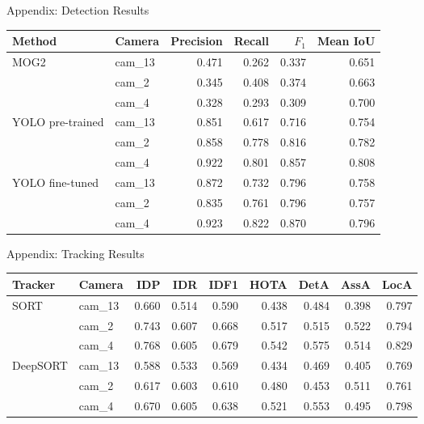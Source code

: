 \begin{frame}{Appendix: Detection Results}
\footnotesize
\centering
\begin{tabular}{llrrrr}
\toprule
Method & Camera & Precision & Recall & $F_1$ & Mean IoU \\
\midrule
\multirow{3}{*}{MOG2}
  & cam\_13 & 0.471 & 0.262 & 0.337 & 0.651 \\
  & cam\_2  & 0.345 & 0.408 & 0.374 & 0.663 \\
  & cam\_4  & 0.328 & 0.293 & 0.309 & 0.700 \\
\midrule
\multirow{3}{*}{YOLO pre-trained}
  & cam\_13 & 0.851 & 0.617 & 0.716 & 0.754 \\
  & cam\_2  & 0.858 & 0.778 & 0.816 & 0.782 \\
  & cam\_4  & 0.922 & 0.801 & 0.857 & 0.808 \\
\midrule
\multirow{3}{*}{YOLO fine-tuned}
  & cam\_13 & 0.872 & 0.732 & 0.796 & 0.758 \\
  & cam\_2  & 0.835 & 0.761 & 0.796 & 0.757 \\
  & cam\_4  & 0.923 & 0.822 & 0.870 & 0.796 \\
\bottomrule
\end{tabular}
\end{frame}

\begin{frame}{Appendix: Tracking Results}
\footnotesize
\centering
\setlength{\tabcolsep}{4.5pt}
\begin{tabular}{llrrrrrrr}
\toprule
Tracker & Camera & IDP & IDR & IDF1 & HOTA & DetA & AssA & LocA \\
\midrule
\multirow{3}{*}{SORT}
  & cam\_13 & 0.660 & 0.514 & 0.590 & 0.438 & 0.484 & 0.398 & 0.797 \\
  & cam\_2  & 0.743 & 0.607 & 0.668 & 0.517 & 0.515 & 0.522 & 0.794 \\
  & cam\_4  & 0.768 & 0.605 & 0.679 & 0.542 & 0.575 & 0.514 & 0.829 \\
\midrule
\multirow{3}{*}{DeepSORT}
  & cam\_13 & 0.588 & 0.533 & 0.569 & 0.434 & 0.469 & 0.405 & 0.769 \\
  & cam\_2  & 0.617 & 0.603 & 0.610 & 0.480 & 0.453 & 0.511 & 0.761 \\
  & cam\_4  & 0.670 & 0.605 & 0.638 & 0.521 & 0.553 & 0.495 & 0.798 \\
\bottomrule
\end{tabular}
\end{frame}

